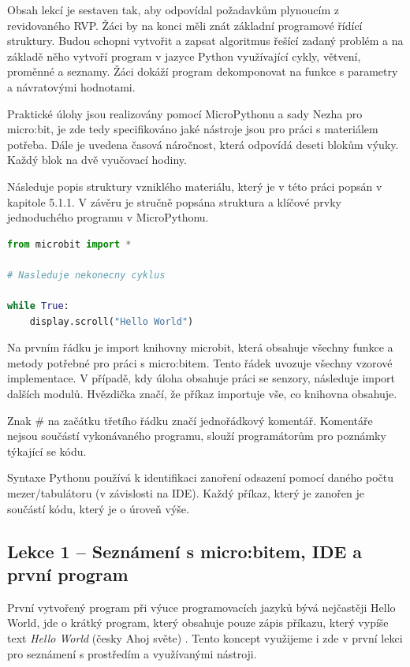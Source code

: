 \documentclass[
  digital,     %
  oneside,     %
  nosansbold,  %
  colorbold, %
  lof,         %
  nolot,         %
]{fithesis4}
\begin{document}
Obsah lekcí je sestaven tak, aby odpovídal požadavkům plynoucím z revidovaného RVP. Žáci by na konci měli znát základní programové řídící struktury. Budou schopni vytvořit a zapsat algoritmus řešící zadaný problém a na základě něho vytvoří program v jazyce Python využívající cykly, větvení, proměnné a seznamy. Žáci dokáží program dekomponovat na funkce s parametry a návratovými hodnotami.

Praktické úlohy jsou realizovány pomocí MicroPythonu a sady Nezha pro micro:bit, je zde tedy specifikováno jaké nástroje jsou pro práci s materiálem potřeba. Dále je uvedena časová náročnost, která odpovídá deseti blokům výuky. Každý blok na dvě vyučovací hodiny.

Následuje popis struktury vzniklého materiálu, který je v této práci popsán v kapitole 5.1.1. V závěru je stručně popsána struktura a klíčové prvky jednoduchého programu v MicroPythonu. 
\begin{lstlisting}[language=Python, caption=struktura programu v MicroPythonu]
from microbit import *

# Nasleduje nekonecny cyklus

while True:
    display.scroll("Hello World")
\end{lstlisting}

Na prvním řádku je import knihovny microbit, která obsahuje všechny funkce a metody potřebné pro práci s micro:bitem. Tento řádek uvozuje všechny vzorové implementace. V případě, kdy úloha obsahuje práci se senzory, následuje import dalších modulů. Hvězdička značí, že příkaz importuje vše, co knihovna obsahuje.

Znak \# na začátku třetího řádku značí jednořádkový komentář. Komentáře nejsou součástí vykonávaného programu, slouží programátorům pro poznámky týkající se kódu.

Syntaxe Pythonu používá k identifikaci zanoření odsazení pomocí daného počtu mezer/tabulátoru (v závislosti na IDE). Každý příkaz, který je zanořen je součástí kódu, který je o úroveň výše.

\subsection{Lekce 1 -- Seznámení s micro:bitem, IDE a první program}
První vytvořený program při výuce programovacích jazyků bývá nejčastěji Hello World, jde o krátký program, který obsahuje pouze zápis příkazu, který vypíše text \textit{Hello World} (česky Ahoj světe) \cite{helloWorld}. Tento koncept využijeme i zde v první lekci pro seznámení s prostředím a využívanými nástroji.
\end{document}
